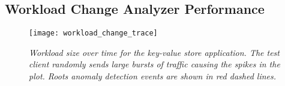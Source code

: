 

\subsection{Workload Change Analyzer Performance}

\begin{figure}
\centering
\texttt{[image: workload\_change\_trace]}
\vspace{-0.2in}
\caption{\textit{Workload size over time for the key-value store application. The test client randomly sends
large bursts of traffic causing the spikes in the plot. Roots anomaly detection events are shown
in red dashed lines.}}
\vspace{-0.2in}
\label{fig:workload_change}
\end{figure}


